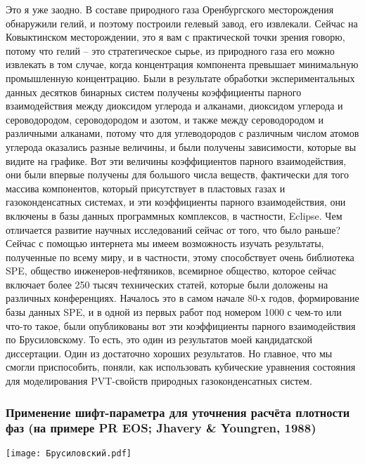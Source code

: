 \documentclass[main.tex]{subfiles}
\begin{document}
Это я уже заодно.
В составе природного газа Оренбургского месторождения обнаружили гелий, и поэтому построили гелевый завод, его извлекали.
Сейчас на Ковыктинском месторождении, это я вам с практической точки зрения говорю, потому что гелий -- это стратегическое сырье, из природного газа его можно извлекать в том случае, когда концентрация компонента превышает минимальную промышленную концентрацию.
Были в результате обработки экспериментальных данных десятков бинарных систем получены коэффициенты парного взаимодействия между диоксидом углерода и алканами, диоксидом углерода и сероводородом, сероводородом и азотом, и также между сероводородом и различными алканами, потому что для углеводородов с различным числом атомов углерода оказались разные величины, и были получены зависимости, которые вы видите на графике.
Вот эти величины коэффициентов парного взаимодействия, они были впервые получены для большого числа веществ, фактически для того массива компонентов, который присутствует в пластовых газах и газоконденсатных системах, и эти коэффициенты парного взаимодействия, они включены в базы данных программных комплексов, в частности, Eclipse.
Чем отличается развитие научных исследований сейчас от того, что было раньше?
Сейчас с помощью интернета мы имеем возможность изучать результаты, полученные по всему миру, и в частности, этому способствует очень библиотека SPE, общество инженеров-нефтяников, всемирное общество, которое сейчас включает более 250 тысяч технических статей, которые были доложены на различных конференциях.
Началось это в самом начале 80-х годов, формирование базы данных SPE, и в одной из первых работ под номером 1000 с чем-то или что-то такое, были опубликованы вот эти коэффициенты парного взаимодействия по Брусиловскому.
То есть, это один из результатов моей кандидатской диссертации.
Один из достаточно хороших результатов.
Но главное, что мы смогли приспособить, поняли, как использовать кубические уравнения состояния для моделирования PVT-свойств природных газоконденсатных систем.

\subsubsection{Применение шифт-параметра для уточнения расчёта плотности фаз (на примере PR EOS; Jhavery \& Youngren, 1988)}

\begin{center}
\texttt{[image: Брусиловский.pdf]}
\end{center}
\end{document}
